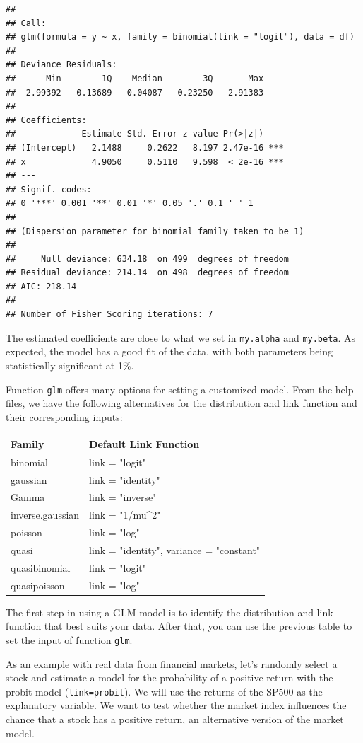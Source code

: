 \documentclass[11pt,]{book}
\begin{document}
\begin{verbatim}
## 
## Call:
## glm(formula = y ~ x, family = binomial(link = "logit"), data = df)
## 
## Deviance Residuals: 
##      Min        1Q    Median        3Q       Max  
## -2.99392  -0.13689   0.04087   0.23250   2.91383  
## 
## Coefficients:
##             Estimate Std. Error z value Pr(>|z|)    
## (Intercept)   2.1488     0.2622   8.197 2.47e-16 ***
## x             4.9050     0.5110   9.598  < 2e-16 ***
## ---
## Signif. codes:  
## 0 '***' 0.001 '**' 0.01 '*' 0.05 '.' 0.1 ' ' 1
## 
## (Dispersion parameter for binomial family taken to be 1)
## 
##     Null deviance: 634.18  on 499  degrees of freedom
## Residual deviance: 214.14  on 498  degrees of freedom
## AIC: 218.14
## 
## Number of Fisher Scoring iterations: 7
\end{verbatim}

The estimated coefficients are close to what we set in \texttt{my.alpha}
and \texttt{my.beta}. As expected, the model has a good fit of the data,
with both parameters being statistically significant at 1\%.

Function \texttt{glm} offers many options for setting a customized
model. From the help files, we have the following alternatives for the
distribution and link function and their corresponding inputs:

\begin{tabular}{l|l}
\hline
Family & Default Link Function\\
\hline
binomial & link = "logit"\\
\hline
gaussian & link = "identity"\\
\hline
Gamma & link = "inverse"\\
\hline
inverse.gaussian & link = "1/mu\textasciicircum{}2"\\
\hline
poisson & link = "log"\\
\hline
quasi & link = "identity", variance = "constant"\\
\hline
quasibinomial & link = "logit"\\
\hline
quasipoisson & link = "log"\\
\hline
\end{tabular}

The first step in using a GLM model is to identify the distribution and
link function that best suits your data. After that, you can use the
previous table to set the input of function \texttt{glm}.

As an example with real data from financial markets, let's randomly
select a stock and estimate a model for the probability of a positive
return with the probit model
(\texttt{link=\textquotesingle{}probit\textquotesingle{}}). We will use
the returns of the SP500 as the explanatory variable. We want to test
whether the market index influences the chance that a stock has a
positive return, an alternative version of the market model.
\end{document}

